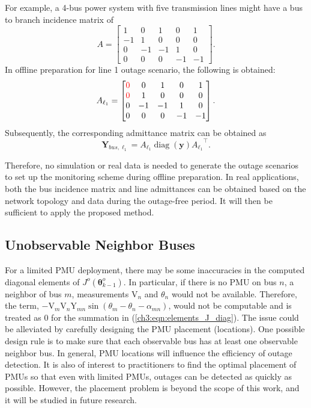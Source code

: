 For example, a 4-bus power system with five transmission lines might have a bus to branch incidence matrix of \[ {A} = \begin{bmatrix}
1   &   0   &   1   &   0   &   1 \\
-1  &   1   &   0   &   0   &   0 \\
0   &   -1  &   -1  &   1   &   0 \\
0   &   0   &   0   &   -1  &   -1
\end{bmatrix} .\]
In offline preparation for line 1 outage scenario, the following is obtained:
\[ {A}_{\ell_1} = \begin{bmatrix}
\color{red} 0   &   0   &   1   &   0   &   1 \\
\color{red} 0   &   1   &   0   &   0   &   0 \\
0   &   -1  &   -1  &   1   &   0 \\
0   &   0   &   0   &   -1  &   -1
\end{bmatrix} .\] Subsequently, the corresponding admittance matrix can be obtained as $$\boldsymbol{Y}_{bus, \ell_1} = {A_{\ell_1} \operatorname{diag}(\mathbf{y}) A_{\ell_1}}^{\top}.$$

Therefore, no simulation or real data is needed to generate the outage scenarios to set up the monitoring scheme during offline preparation. In real applications, both the bus incidence matrix and line admittances can be obtained based on the network topology and data during the outage-free period. It will then be sufficient to apply the proposed method.

\subsection{Unobservable Neighbor Buses}
For a limited PMU deployment, there may be some inaccuracies in the computed diagonal elements of ${J}^o(\boldsymbol{\theta}^o_{k-1})$. In particular, if there is no PMU on bus $n$, a neighbor of bus $m$, measurements $\text{V}_{n}$ and $\theta_{n}$ would not be available. Therefore, the term, $-\text{V}_{m} \text{V}_{n} \text{Y}_{m n} \sin \left(\theta_{m}-\theta_{n}-\alpha_{m n}\right)$, would not be computable and is treated as 0 for the summation in (\ref{ch3:eqn:elements_J_diag}). The issue could be alleviated by carefully designing the PMU placement (locations). One possible design rule is to make sure that each observable bus has at least one observable neighbor bus. In general, PMU locations will influence the efficiency of outage detection. It is also of interest to practitioners to find the optimal placement of PMUs so that even with limited PMUs, outages can be detected as quickly as possible. However, the placement problem is beyond the scope of this work, and it will be studied in future research. 

